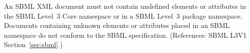 An SBML XML document must not contain undefined elements or attributes in
the SBML Level~3 Core namespace or in a SBML Level~3 package namespace.
Documents containing unknown elements or attributes placed in an SBML
namespace do not conform to the SBML specification.  (References: SBML L3V1
Section~\ref{sec:sbml}.)

